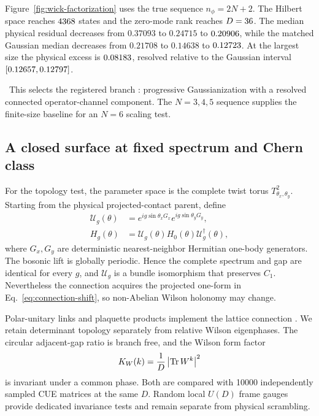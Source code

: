 Figure~\ref{fig:wick-factorization} uses the true sequence \(n_\phi=2N+2\). The Hilbert space reaches \(4368\) states and the zero-mode rank reaches \(D=36\). The median physical residual decreases from \(0.37093\) to \(0.24715\) to \(0.20906\), while the matched Gaussian median decreases from \(0.21708\) to \(0.14638\) to \(0.12723\). At the largest size the physical excess is \(0.08183\), resolved relative to the Gaussian interval \([0.12657,0.12797]\).

\MatrixElementBranchText\ This selects the registered branch \texttt{\MatrixElementBranch}: progressive Gaussianization with a resolved connected operator-channel component. The \(N=3,4,5\) sequence supplies the finite-size baseline for an \(N=6\) scaling test.

\subsection{A closed surface at fixed spectrum and Chern class}

For the topology test, the parameter space is the complete twist torus \(T^2_{\theta_x,\theta_y}\). Starting from the physical projected-contact parent, define
\begin{equation}
 \begin{aligned}
 \mathcal U_g(\theta)
 &=e^{ig\sin\theta_xG_x}e^{ig\sin\theta_yG_y},\\
 H_g(\theta)
 &=\mathcal U_g(\theta)H_0(\theta)\mathcal U_g^\dagger(\theta),
 \end{aligned}
 \label{eq:main-isospectral-orbit}
\end{equation}
where \(G_x,G_y\) are deterministic nearest-neighbor Hermitian one-body generators. The bosonic lift is globally periodic. Hence the complete spectrum and gap are identical for every \(g\), and \(\mathcal U_g\) is a bundle isomorphism that preserves \(C_1\). Nevertheless the connection acquires the projected one-form in Eq.~\eqref{eq:connection-shift}, so non-Abelian Wilson holonomy may change.

Polar-unitary links and plaquette products implement the lattice connection \cite{fukui2005}. We retain determinant topology separately from relative Wilson eigenphases. The circular adjacent-gap ratio is branch free, and the Wilson form factor
\begin{equation}
 K_W(k)=\frac{1}{D}\left|\operatorname{Tr} W^k\right|^2
 \label{eq:wilson-form-factor}
\end{equation}
is invariant under a common phase. Both are compared with 10000 independently sampled CUE matrices at the same \(D\). Random local \(U(D)\) frame gauges provide dedicated invariance tests and remain separate from physical scrambling.


